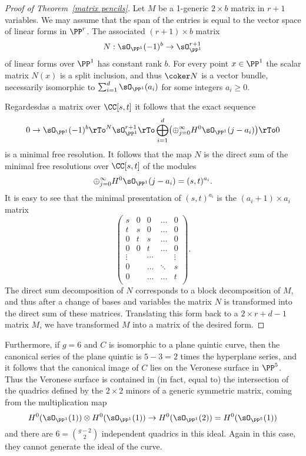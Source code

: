 \begin{proof}[Proof of Theorem~\ref{matrix pencils}]
Let $M$ be a 1-generic $2\times b$ matrix in $r+1$ variables. We may assume that the span of the entries
is equal to the vector space of linear forms in $\PP^{r}$. The associated 
$(r+1)\times b$ matrix
$$
N: \sO_{\PP^{1}}(-1)^{b} \to \sO_{\PP^{1}}^{r+1}
$$
 of linear forms over $\PP^{1}$ has constant rank $b$.
For every point $x\in \PP^{1}$ the scalar matrix $N(x)$ is a split inclusion, and thus
$\coker N$ is a vector bundle, necessarily isomorphic to $\sum_{i =1}^{d}\sO_{\PP^{1}}(a_{i})$ for some
integers $a_{i}\geq 0$. 

Regardesdas a matrix over $\CC[s,t]$ it follows that the exact sequence
$$
0\to \sO_{\PP^{1}}(-1)^{b} \rTo^{N} \sO_{\PP^{1}}^{r+1}  \rTo \bigoplus_{i = 1}^{d}\bigl( \oplus_{j=0}^{\infty}H^{0}\sO_{\PP^{1}}(j-a_{i})\bigr)\rTo 0
$$
is a minimal free resolution. It follows that the map $N$ is the direct sum of the minimal free resolutions over $\CC[s,t]$
of the modules 
$$
\oplus_{j=0}^{\infty}H^{0}\sO_{\PP^{1}}(j-a_{i}) = (s,t)^{a_{i}}.
$$
It is easy to see that the minimal presentation of $(s,t)^{a_{i}}$ is the $(a_{i}+1)\times a_{i}$ matrix
$$
\begin{pmatrix}
s&0&0&\dots&0\\
t&s&0&\dots&0\\
0&t&s&\dots&0\\
0&0&t&\dots&0\\
\vdots&&\cdots&&\vdots\\
0&&\dots&\ddots&s\\
0&&\dots&\dots&t\\
\end{pmatrix}.
$$
The direct sum decomposition of $N$ corresponds to a block decomposition of $M$,
and thus after a change of bases and variables the matrix $N$ is transformed into the direct sum of these matrices.
Translating this form back to a $2\times r+d-1$ matrix $M$, we have transformed $M$ into a matrix of 
the desired form.
\end{proof}


Furthermore, if $g = 6$ and $C$ is isomorphic to a plane quintic curve, then the canonical series of the plane quintic is $5-3 = 2$ times the hyperplane series, and it follows that the canonical image of $C$ lies on the Veronese surface in $\PP^{5}$. Thus the Veronese surface is contained in (in fact, equal to) the intersection of the quadrics defined by the $2\times 2$ minors of a generic symmetric matrix, coming from the 
multiplication map 
$$
H^{0}(\sO_{\PP^{1}}(1))\otimes H^{0}(\sO_{\PP^{1}}(1)) \to H^{0}(\sO_{\PP^{1}}(2)) = H^{0}(\sO_{\PP^{5}}(1))
$$
and there are $6 = {g-2\choose 2}$ independent quadrics in this ideal. Again in this case, they cannot generate the ideal of the curve.

